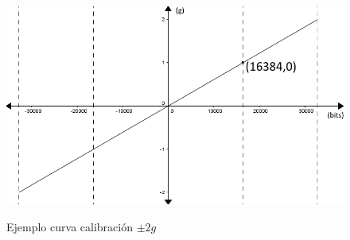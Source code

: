 \documentclass[12pt,a4paper]{article}
\begin{document}
\begin{itemize}
				\begin{figure}[H]
					\centering
					\includegraphics[scale=0.6]{images/curvacalibracion}
					\label{fig:curvacalibracion}
					\caption{Ejemplo curva calibración $\pm 2g$}
				\end{figure}
				
			\end{itemize}
			
\end{document}
